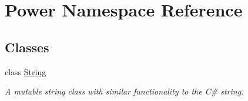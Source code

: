 \hypertarget{namespace_power}{}\section{Power Namespace Reference}
\label{namespace_power}
\subsection*{Classes}
\begin{DoxyCompactItemize}
\item 
class \hyperlink{class_power_1_1_string}{String}
\begin{DoxyCompactList}\small\item\em A mutable string class with similar functionality to the C\# string. \end{DoxyCompactList}\end{DoxyCompactItemize}
